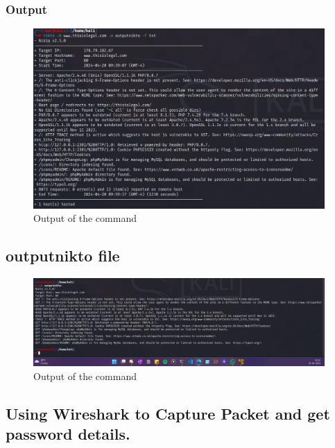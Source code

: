 \documentclass[11pt]{article}
\begin{document}
\subsubsection*{Output}
\begin{figure}[H]
    \centering
    \includegraphics[width=0.99\textwidth]{assignment 8 (7).png}
    \caption{Output of the command}
\end{figure}

\subsection{outputnikto file}

\begin{figure}[H]
    \centering
    \includegraphics[width=0.99\textwidth]{assignment 8 (8).png}
    \caption{Output of the command}
\end{figure}


\subsection{Using Wireshark to Capture Packet and get password details. }
\end{document}
